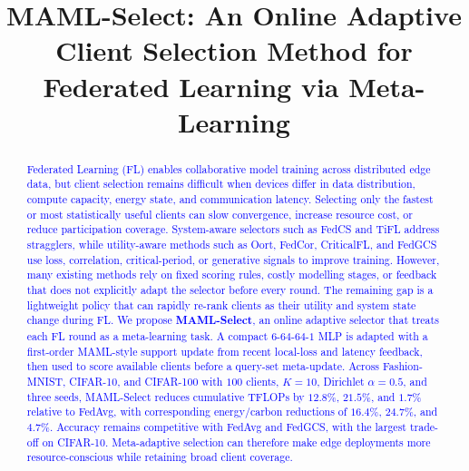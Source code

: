 \documentclass[journal]{IEEEtran}
\newcommand{\revision}[1]{\textcolor{blue}{#1}}
\begin{document}
\title{MAML-Select: An Online Adaptive Client Selection Method for Federated Learning via Meta-Learning}


\maketitle

\begin{abstract}
\revision{Federated Learning (FL) enables collaborative model training across distributed edge data, but client selection remains difficult when devices differ in data distribution, compute capacity, energy state, and communication latency. Selecting only the fastest or most statistically useful clients can slow convergence, increase resource cost, or reduce participation coverage. System-aware selectors such as FedCS and TiFL address stragglers, while utility-aware methods such as Oort, FedCor, CriticalFL, and FedGCS use loss, correlation, critical-period, or generative signals to improve training. However, many existing methods rely on fixed scoring rules, costly modelling stages, or feedback that does not explicitly adapt the selector before every round. The remaining gap is a lightweight policy that can rapidly re-rank clients as their utility and system state change during FL. We propose \textbf{MAML-Select}, an online adaptive selector that treats each FL round as a meta-learning task. A compact $6$-$64$-$64$-$1$ MLP is adapted with a first-order MAML-style support update from recent local-loss and latency feedback, then used to score available clients before a query-set meta-update. Across Fashion-MNIST, CIFAR-10, and CIFAR-100 with $100$ clients, $K=10$, Dirichlet $\alpha=0.5$, and three seeds, MAML-Select reduces cumulative TFLOPs by $12.8\%$, $21.5\%$, and $1.7\%$ relative to FedAvg, with corresponding energy/carbon reductions of $16.4\%$, $24.7\%$, and $4.7\%$. Accuracy remains competitive with FedAvg and FedGCS, with the largest trade-off on CIFAR-10. Meta-adaptive selection can therefore make edge deployments more resource-conscious while retaining broad client coverage.}
\end{abstract}
\end{document}
